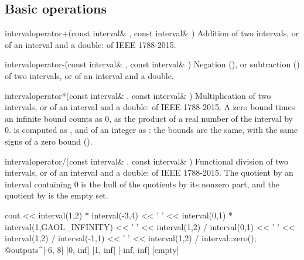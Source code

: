 \documentclass[12pt,a4paper,twoside,openright]{book}
\begin{document}
\subsection{Basic operations}\label{sec:arithmetic-basic}

\begin{deffun}{interval}{operator+}{(const interval\& , const interval\& )}
  Addition of two intervals, or of an interval and a double:  of
  IEEE 1788-2015.
\end{deffun}

\begin{deffun}{interval}{operator-}{(const interval\& , const interval\& )}
  Negation (), or subtraction () of two intervals, or of
  an interval and a double.
\end{deffun}

\begin{deffun}{interval}{operator*}{(const interval\& , const interval\& )}
  Multiplication of two intervals, or of an interval and a double: 
  of IEEE 1788-2015. A zero bound times an infinite bound counts as $0$, as
  the product of a real number of the interval by 0.\newinvfive{} 
  is computed as , and  of an integer  as
  : the bounds are the same, with the same signs of a zero bound
  ().\newinvfive
\end{deffun}

\begin{deffun}{interval}{operator/}{(const interval\& , const interval\& )}
  Functional division of two intervals, or of an interval and a double:
   of IEEE 1788-2015. The quotient by an interval containing 0 is
  the hull of the quotients by its nonzero part, and the quotient by
   is the empty set.
\begin{example}
cout << interval(1,2) * interval(-3,4) << ' '
     << interval(0,1) * interval(1,GAOL_INFINITY) << ' '
     << interval(1,2) / interval(0,1) << ' '
     << interval(1,2) / interval(-1,1) << ' '
     << interval(1,2) / interval::zero();
@outputs^[-6, 8] [0, inf] [1, inf] [-inf, inf] [empty]~
\end{example}
\end{deffun}
\end{document}
